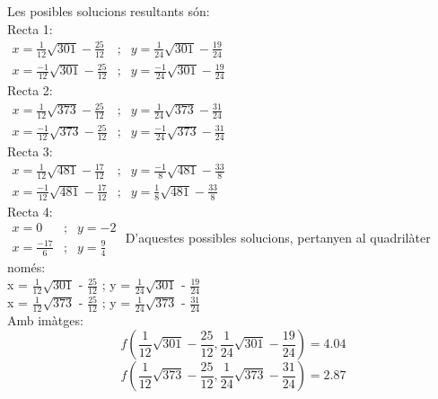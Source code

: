 \documentclass[12pt]{report}
\begin{document}
Les posibles solucions resultants són:\\
Recta 1:\\
\hspace{5em} $\begin{array}{ccc}
    x = \frac{1}{12}\sqrt{301} - \frac{25}{12} & ; & y = \frac{1}{24}\sqrt{301} - \frac{19}{24} \\
    x = \frac{-1}{12}\sqrt{301} - \frac{25}{12} & ; & y = \frac{-1}{24}\sqrt{301} - \frac{19}{24}
\end{array}$\\
Recta 2:\\
\hspace{5em} $\begin{array}{ccc}
    x = \frac{1}{12}\sqrt{373} - \frac{25}{12} & ; & y = \frac{1}{24}\sqrt{373} - \frac{31}{24}\\
    x = \frac{-1}{12}\sqrt{373} - \frac{25}{12} & ; & y = \frac{-1}{24}\sqrt{373} - \frac{31}{24}
\end{array}$\\
Recta 3:\\
\hspace{5em} $\begin{array}{ccc}
    x = \frac{1}{12}\sqrt{481} - \frac{17}{12} & ; & y = \frac{-1}{8}\sqrt{481} - \frac{33}{8}\\
    x = \frac{-1}{12}\sqrt{481} - \frac{17}{12} & ; & y = \frac{1}{8}\sqrt{481} - \frac{33}{8}
\end{array}$\\
Recta 4:\\
\hspace{5em} $\begin{array}{ccc}
    x = 0 & ; & y = -2\\
    x = \frac{-17}{6} & ; & y = \frac{9}{4}
\end{array}$
\newline
D'aquestes possibles solucions, pertanyen al quadrilàter només:\\
x = $\frac{1}{12}\sqrt{301}$ - $\frac{25}{12}$ ; y = $\frac{1}{24}\sqrt{301}$ - $\frac{19}{24}$\\
x = $\frac{1}{12}\sqrt{373}$ - $\frac{25}{12}$ ; y = $\frac{1}{24}\sqrt{373}$ - $\frac{31}{24}$\\

Amb imàtges:
\[f\left(\frac{1}{12}\sqrt{301} - \frac{25}{12},\frac{1}{24}\sqrt{301} - \frac{19}{24} \right) = 4.04\]
\[f\left(\frac{1}{12}\sqrt{373} - \frac{25}{12}, \frac{1}{24}\sqrt{373} - \frac{31}{24} \right) = 2.87\]
\end{document}
